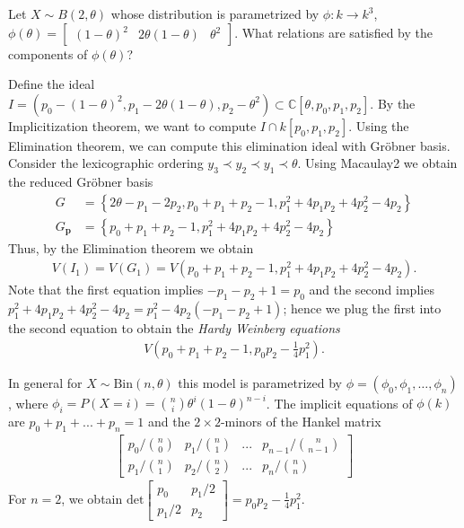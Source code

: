 \begin{eg}
  Let \( X \sim B(2, \theta) \) whose distribution is parametrized by \( \phi: k \to k^3 \), \( \phi(\theta) = \begin{bmatrix}
    (1 - \theta)^2 & 2\theta(1 - \theta) & \theta^2
  \end{bmatrix} \). What relations are satisfied by the components of \( \phi(\theta) \)?

  Define the ideal \( I = (p_0 - (1 - \theta)^2, p_1 - 2\theta(1 - \theta), p_2 - \theta^2) \subset \mathbb{C}[\theta, p_0, p_1, p_2] \). By the Implicitization theorem, we want to compute \( I \cap k[p_0,p_1,p_2] \). Using the Elimination theorem, we can compute this elimination ideal with Gröbner basis. Consider the lexicographic ordering \( y_3 \prec y_2 \prec y_1 \prec \theta \). Using Macaulay2 we obtain the reduced Gröbner basis 
  \begin{align*}
    G &= \left\{ 2 \theta - p_1 - 2p_2, p_0 + p_1 + p_2 - 1, p_1^2 + 4 p_1 p_2 + 4p_2^2 - 4p_2 \right\} \\
    G_{\mathbf p} &= \left\{ p_0 + p_1 + p_2 - 1, p_1^2 + 4 p_1 p_2 + 4p_2^2 - 4p_2 \right\} 
  \end{align*}
  Thus, by the Elimination theorem we obtain 
  \begin{align*}
    V(I_1) = V(G_1) = V(p_0 + p_1 + p_2 - 1,  p_1^2 + 4 p_1 p_2 + 4p_2^2 - 4p_2).
  \end{align*}
  Note that the first equation implies \( -p_1 -p_2 + 1 = p_0 \) and the second implies \( p_1^2 + 4 p_1 p_2 + 4p_2^2 - 4p_2 = p_1^2 - 4p_2 (-p_1 - p_2 + 1) \); hence we plug the first into the second equation to obtain the \emph{Hardy Weinberg equations}
  \begin{align*}
    V( p_0 + p_1 + p_2 - 1, p_0 p_2 - \frac{1}{4}p_1^2).
  \end{align*}
\end{eg}

\begin{eg}
  In general for \( X \sim \mathrm{Bin}(n, \theta) \) this model is parametrized by \( \phi = (\phi_0, \phi_1 , \dots, \phi_n) \), where \( \phi_i = P(X = i) = {n \choose i}\theta^{i} (1 - \theta)^{n - i} \). The implicit equations of \( \phi(k) \) are \( p_0 + p_1 + ... + p_n = 1 \) and the \( 2 \times 2 \)-minors of the Hankel matrix 
\begin{align*}
  \begin{bmatrix}
    p_0 / {n \choose 0} & p_1  / {n \choose 1} & ... & p_{n-1}  / {n \choose n-1} \\
    p_1 / {n \choose 1} & p_2  / {n \choose 2} & ... & p_{n}  / {n \choose n}
  \end{bmatrix}
\end{align*}
For \( n = 2 \), we obtain \( \mathrm{det}\begin{bmatrix}
  p_0 & p_1 / 2 \\ p_1 / 2& p_2
\end{bmatrix} = p_0 p_2 - \frac{1}{4}p_1^2\).
\end{eg}



